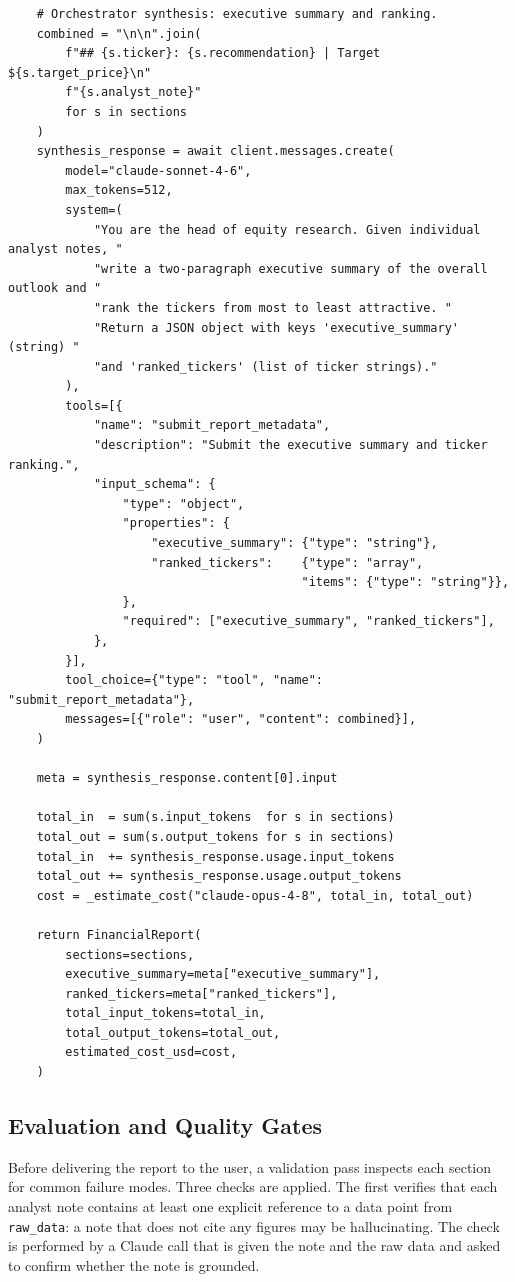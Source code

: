 \begin{verbatim}
    # Orchestrator synthesis: executive summary and ranking.
    combined = "\n\n".join(
        f"## {s.ticker}: {s.recommendation} | Target ${s.target_price}\n"
        f"{s.analyst_note}"
        for s in sections
    )
    synthesis_response = await client.messages.create(
        model="claude-sonnet-4-6",
        max_tokens=512,
        system=(
            "You are the head of equity research. Given individual analyst notes, "
            "write a two-paragraph executive summary of the overall outlook and "
            "rank the tickers from most to least attractive. "
            "Return a JSON object with keys 'executive_summary' (string) "
            "and 'ranked_tickers' (list of ticker strings)."
        ),
        tools=[{
            "name": "submit_report_metadata",
            "description": "Submit the executive summary and ticker ranking.",
            "input_schema": {
                "type": "object",
                "properties": {
                    "executive_summary": {"type": "string"},
                    "ranked_tickers":    {"type": "array",
                                         "items": {"type": "string"}},
                },
                "required": ["executive_summary", "ranked_tickers"],
            },
        }],
        tool_choice={"type": "tool", "name": "submit_report_metadata"},
        messages=[{"role": "user", "content": combined}],
    )

    meta = synthesis_response.content[0].input

    total_in  = sum(s.input_tokens  for s in sections)
    total_out = sum(s.output_tokens for s in sections)
    total_in  += synthesis_response.usage.input_tokens
    total_out += synthesis_response.usage.output_tokens
    cost = _estimate_cost("claude-opus-4-8", total_in, total_out)

    return FinancialReport(
        sections=sections,
        executive_summary=meta["executive_summary"],
        ranked_tickers=meta["ranked_tickers"],
        total_input_tokens=total_in,
        total_output_tokens=total_out,
        estimated_cost_usd=cost,
    )
\end{verbatim}

\subsection{Evaluation and Quality Gates}
\label{app:sdk-commercial:example:eval}

Before delivering the report to the user, a validation pass inspects each section for
common failure modes. Three checks are applied. The first verifies that each analyst
note contains at least one explicit reference to a data point from \texttt{raw\_data}:
a note that does not cite any figures may be hallucinating. The check is performed by
a Claude call that is given the note and the raw data and asked to confirm whether the
note is grounded.

